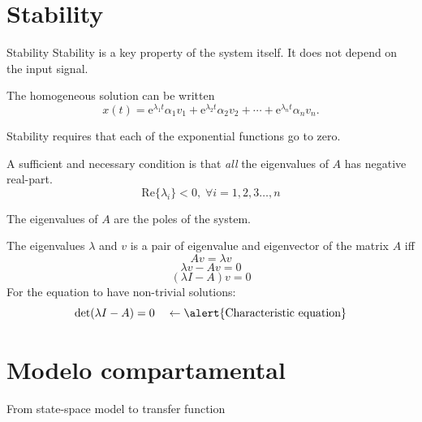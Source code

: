 \documentclass[presentation,aspectratio=169]{beamer}
\begin{document}
\section{Stability}
\label{sec:orga9f7467}

\begin{frame}[label={sec:org2a1555a}]{Stability}
Stability is a key property of the system itself. It does not depend on the input signal.

The homogeneous solution can be written
   \[ x(t) = \mathrm{e}^{\lambda_1 t}\alpha_1v_1 + \mathrm{e}^{\lambda_2 t}\alpha_2v_2 + \cdots + \mathrm{e}^{\lambda_n t}\alpha_nv_n.\]

\pause

Stability requires that \alert{each} of the exponential functions go to zero.

\pause

\begin{center}
A sufficient and necessary condition is that \emph{all} the eigenvalues of $A$ has negative real-part. \[ \mathrm{Re}\{\lambda_i\} < 0, \; \forall i=1,2,3\ldots, n\]
\end{center}

The eigenvalues of \(A\) are the \alert{poles} of the system.
\end{frame}

\begin{frame}[label={sec:org059eb60}]{The eigenvalues}
\(\lambda\) and \(v\) is a pair of eigenvalue and eigenvector of the matrix \(A\) iff
\[Av = \lambda v\]
\pause
\[ \lambda v - Av = 0\]
\pause
\[ (\lambda I - A)v = 0\]
\pause
For the equation to have non-trivial solutions:
 \[ \det (\lambda I - A) = 0 \quad \leftarrow \text{\alert{Characteristic equation}}\]
\end{frame}


\section{Modelo compartamental}
\label{sec:orgbf111f0}

\begin{frame}[label={sec:org264662c}]{From state-space model to transfer function}
\end{frame}
\end{document}
